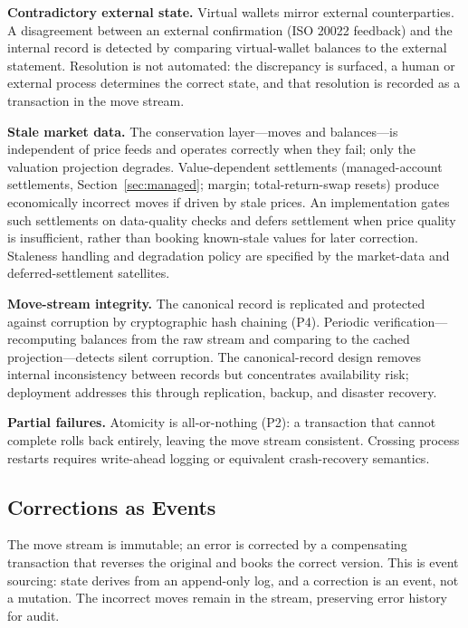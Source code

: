 \documentclass[11pt,a4paper]{article}
\begin{document}
\noindent\textbf{Contradictory external state.} Virtual wallets mirror external counterparties. A disagreement between an external confirmation (ISO 20022 feedback) and the internal record is detected by comparing virtual-wallet balances to the external statement. Resolution is not automated: the discrepancy is surfaced, a human or external process determines the correct state, and that resolution is recorded as a transaction in the move stream.

\noindent\textbf{Stale market data.} The conservation layer---moves and balances---is independent of price feeds and operates correctly when they fail; only the valuation projection degrades. Value-dependent settlements (managed-account settlements, Section~\ref{sec:managed}; margin; total-return-swap resets) produce economically incorrect moves if driven by stale prices. An implementation gates such settlements on data-quality checks and defers settlement when price quality is insufficient, rather than booking known-stale values for later correction. Staleness handling and degradation policy are specified by the market-data and deferred-settlement satellites.

\noindent\textbf{Move-stream integrity.} The canonical record is replicated and protected against corruption by cryptographic hash chaining (P4). Periodic verification---recomputing balances from the raw stream and comparing to the cached projection---detects silent corruption. The canonical-record design removes internal inconsistency between records but concentrates availability risk; deployment addresses this through replication, backup, and disaster recovery.

\noindent\textbf{Partial failures.} Atomicity is all-or-nothing (P2): a transaction that cannot complete rolls back entirely, leaving the move stream consistent. Crossing process restarts requires write-ahead logging or equivalent crash-recovery semantics.

\subsection{Corrections as Events}
\label{sec:implementation-corrections}

The move stream is immutable; an error is corrected by a compensating transaction that reverses the original and books the correct version. This is event sourcing: state derives from an append-only log, and a correction is an event, not a mutation. The incorrect moves remain in the stream, preserving error history for audit.
\end{document}
